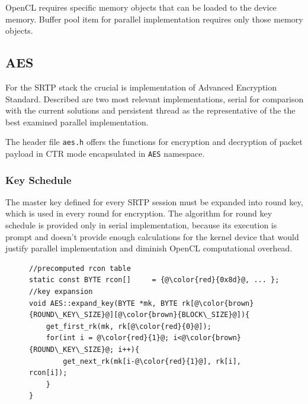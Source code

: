 OpenCL requires specific memory objects that can be loaded to the device memory.
Buffer pool item for parallel implementation requires only those memory objects.


\subsection{AES}
For the SRTP stack the crucial is implementation of Advanced Encryption Standard.
Described are two most relevant implementations, serial for comparison with
the current solutions and persistent thread as the representative of the the
best examined parallel implementation.

The header file \texttt{aes.h} offers the functions for encryption and 
decryption of packet payload in CTR mode encapsulated in \texttt{AES} namespace.

\subsubsection*{Key Schedule}
The master key defined for every SRTP session must be expanded into round key,
which is used in every round for encryption. The algorithm for round key schedule
is provided only in serial implementation, because its execution is prompt and
doesn't provide enough calculations for the kernel device that would justify
parallel implementation and diminish OpenCL computational overhead.

\begin{figure}[H]
\begin{lstlisting}
//precomputed rcon table
static const BYTE rcon[]     = {@\color{red}{0x8d}@, ... };
//key expansion
void AES::expand_key(BYTE *mk, BYTE rk[@\color{brown}{ROUND\_KEY\_SIZE}@][@\color{brown}{BLOCK\_SIZE}@]){
    get_first_rk(mk, rk[@\color{red}{0}@]);
    for(int i = @\color{red}{1}@; i<@\color{brown}{ROUND\_KEY\_SIZE}@; i++){
        get_next_rk(mk[i-@\color{red}{1}@], rk[i], rcon[i]);
    }
}
\end{lstlisting}
\end{figure}

